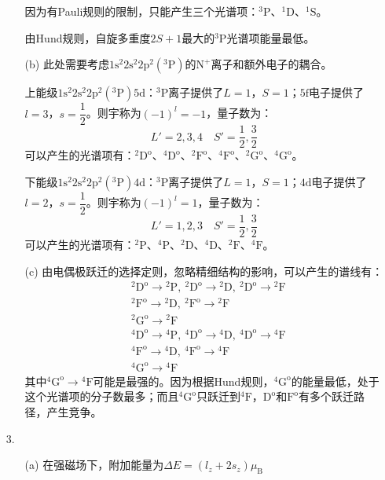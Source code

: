 \documentclass[a4paper]{article}
\begin{document}
\begin{enumerate}
\begin{enumerate}
        因为有Pauli规则的限制，只能产生三个光谱项：$\mathrm{^3P}$、$\mathrm{^1D}$、$\mathrm{^1S}$。

        由Hund规则，自旋多重度$2S+1$最大的$\mathrm{^3P}$光谱项能量最低。
        
        \item[(b)]
        此处需要考虑$\mathrm{1s^2 2s^2 2p^2 (^3P)}$的$\mathrm{N}^+$离子和额外电子的耦合。

        上能级$\mathrm{1s^2 2s^2 2p^2 (^3P) 5d}$：$\mathrm{^3P}$离子提供了$L=1$，$S=1$；$\mathrm{5f}$电子提供了$l=3$，$s=\dfrac{1}{2}$。则宇称为$(-1)^l=-1$，量子数为：
        \[
            L' = 2,3,4\quad S' = \frac{1}{2},\frac{3}{2}
        \]
        可以产生的光谱项有：$\mathrm{^2D^o}$、$\mathrm{^4D^o}$、$\mathrm{^2F^o}$、$\mathrm{^4F^o}$、$\mathrm{^2G^o}$、$\mathrm{^4G^o}$。

        下能级$\mathrm{1s^2 2s^2 2p^2 (^3P) 4d}$：$\mathrm{^3P}$离子提供了$L=1$，$S=1$；$\mathrm{4d}$电子提供了$l=2$，$s=\dfrac{1}{2}$。则宇称为$(-1)^l=1$，量子数为：
        \[
            L' = 1,2,3\quad S' = \frac{1}{2},\frac{3}{2}
        \]
        可以产生的光谱项有：$\mathrm{^2P}$、$\mathrm{^4P}$、$\mathrm{^2D}$、$\mathrm{^4D}$、$\mathrm{^2F}$、$\mathrm{^4F}$。

        \item[(c)]
        由电偶极跃迁的选择定则，忽略精细结构的影响，可以产生的谱线有：
        \begin{align*}
            &\mathrm{^2D^o} \to \mathrm{^2P},\ \mathrm{^2D^o} \to \mathrm{^2D},\ \mathrm{^2D^o} \to \mathrm{^2F} \\
            &\mathrm{^2F^o} \to \mathrm{^2D},\ \mathrm{^2F^o} \to \mathrm{^2F} \\
            &\mathrm{^2G^o} \to \mathrm{^2F} \\
            &\mathrm{^4D^o} \to \mathrm{^4P},\ \mathrm{^4D^o} \to \mathrm{^4D},\ \mathrm{^4D^o} \to \mathrm{^4F} \\
            &\mathrm{^4F^o} \to \mathrm{^4D},\ \mathrm{^4F^o} \to \mathrm{^4F} \\
            &\mathrm{^4G^o} \to \mathrm{^4F}
        \end{align*}
        其中$\mathrm{^4G^o}\to\mathrm{^4F}$可能是最强的。因为根据Hund规则，$\mathrm{^4G^o}$的能量最低，处于这个光谱项的分子数最多；而且$\mathrm{^4G^o}$只跃迁到$\mathrm{^4F}$，$\mathrm{D^o}$和$\mathrm{F^o}$有多个跃迁路径，产生竞争。
    \end{enumerate}

    \bigskip
    \item[3.]
    \begin{enumerate}
        \item[(a)]
        在强磁场下，附加能量为$\Delta E=(l_z+2s_z)\mu_{\mathrm{B}}$


\end{enumerate}
\end{enumerate}
\end{document}
